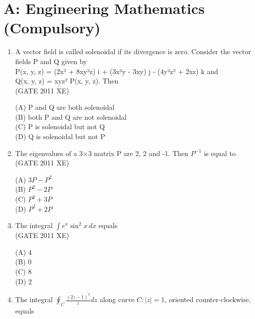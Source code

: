 \documentclass[journal,12pt,onecolumn]{IEEEtran}
\begin{document}
\section*{A: Engineering Mathematics (Compulsory)}
\begin{enumerate}[label=\textbf{Q\arabic*.},itemsep=2em]
\vspace{1cm}

\item A vector field is called solenoidal if its divergence is zero. Consider the vector fields P and Q given by \\
P(x, y, z) = (2x² + 8xy²z) i + (3x²y - 3xy) j - (4y²z² + 2xz) k and \\
Q(x, y, z) = xyz² P(x, y, z). Then \\

\hfill{(GATE 2011 XE)} \\
\begin{multicols}{2}
(A) P and Q are both solenoidal \\
(B) both P and Q are not solenoidal \\
(C) P is solenoidal but not Q \\
(D) Q is solenoidal but not P
\end{multicols}

\item The eigenvalues of a 3×3 matrix P are 2, 2 and -1. Then $P^{-1}$ is equal to \\

\hfill{(GATE 2011 XE)} \\
\begin{multicols}{4}
(A) $3P - P^2$ \\
(B) $P^2 - 2P$ \\
(C) $P^2 + 3P$ \\
(D) $P^2 + 2P$
\end{multicols}

\item The integral $\int e^x \sin^2 x \, dx$ equals \\

\hfill{(GATE 2011 XE)} \\
\begin{multicols}{4}
(A) 4 \\
(B) 0 \\
(C) 8 \\
(D) 2
\end{multicols}

\item The integral $\oint_C \frac{(2z-1)^3}{z} dz$ along curve $C: |z| = 1$, oriented counter-clockwise, equals \\


\end{enumerate}
\end{document}
